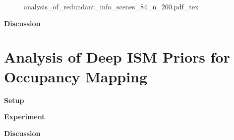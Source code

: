 \begin{figure}[H]
	\begin{center}
		{analysis_of_redundant_info_scenes_84_n_260.pdf_tex}
		\caption{\label{fig:qual_analysis_of_redundant_info}}
	\end{center}
\end{figure}

\textbf{Discussion}
%
\section{Analysis of Deep ISM Priors for Occupancy Mapping}
\label{sec:exp_analyze_prior_properties}
\textbf{Setup}

\textbf{Experiment}

\textbf{Discussion}
